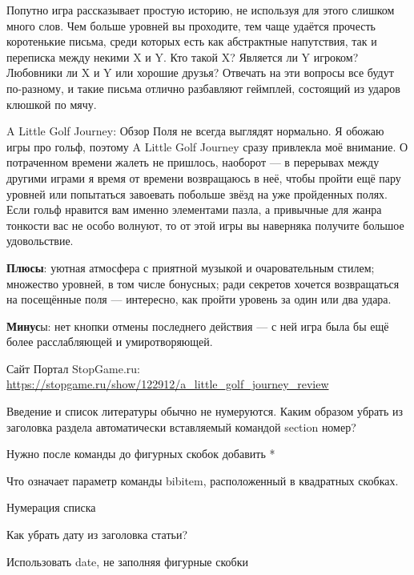 \documentclass{article}
\begin{document}
Попутно игра рассказывает простую историю, не используя для этого слишком много слов. Чем больше уровней вы проходите, тем чаще удаётся прочесть коротенькие письма, среди которых есть как абстрактные напутствия, так и переписка между некими X и Y. Кто такой X? Является ли Y игроком? Любовники ли X и Y или хорошие друзья? Отвечать на эти вопросы все будут по-разному, и такие письма отлично разбавляют геймплей, состоящий из ударов клюшкой по мячу.

A Little Golf Journey: Обзор
Поля не всегда выглядят нормально.
Я обожаю игры про гольф, поэтому A Little Golf Journey сразу привлекла моё внимание. О потраченном времени жалеть не пришлось, наоборот — в перерывах между другими играми я время от времени возвращаюсь в неё, чтобы пройти ещё пару уровней или попытаться завоевать побольше звёзд на уже пройденных полях. Если гольф нравится вам именно элементами пазла, а привычные для жанра тонкости вас не особо волнуют, то от этой игры вы наверняка получите большое удовольствие.

\textbf{Плюсы}: уютная атмосфера с приятной музыкой и очаровательным стилем; множество уровней, в том числе бонусных; ради секретов хочется возвращаться на посещённые поля — интересно, как пройти уровень за один или два удара.

\textbf{Минус}ы: нет кнопки отмены последнего действия — с ней игра была бы ещё более расслабляющей и умиротворяющей.

\begin{thebibliography}{Сайт}
 Портал StopGame.ru: \url{ https://stopgame.ru/show/122912/a_little_golf_journey_review}
\end{thebibliography}

Введение и список литературы обычно не нумеруются. Каким образом убрать из заголовка раздела автоматически вставляемый командой section{} номер?

Нужно после команды до фигурных скобок добавить *

Что означает параметр команды bibitem, расположенный в квадратных скобках.

Нумерация списка

Как убрать дату из заголовка статьи?

Использовать  date{}, не заполняя фигурные скобки
\end{document}
